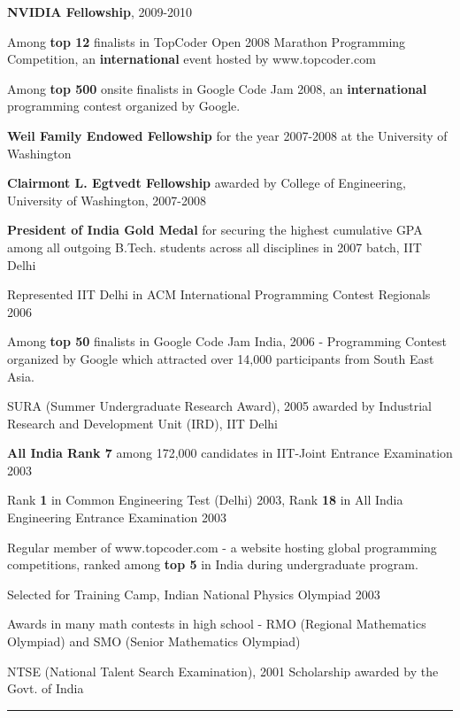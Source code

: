 \documentclass[10pt]{article}
\newenvironment{itemize*}%
  {\begin{itemize}%
    \setlength{\itemsep}{0pt}%
    \setlength{\parskip}{0pt}%
	}
  {\end{itemize}}
\begin{document}
\begin{itemize*}
\item \textbf{NVIDIA Fellowship}, 2009-2010
\item Among \textbf{top 12} finalists in TopCoder Open 2008 Marathon Programming Competition, an \textbf{international} event hosted by www.topcoder.com
\item Among \textbf{top 500} onsite finalists in Google Code Jam 2008, an \textbf{international} programming contest organized by Google.
\item \textbf{Weil Family Endowed Fellowship} for the year 2007-2008 at the University of Washington
\item \textbf{Clairmont L. Egtvedt Fellowship} awarded by College of Engineering, University of Washington, 2007-2008
\item \textbf{President of India Gold Medal} for securing the highest cumulative GPA among all outgoing B.Tech. students  across all disciplines in 2007 batch, IIT Delhi
\item Represented IIT Delhi in ACM International Programming Contest Regionals 2006
\item Among \textbf{top 50} finalists in Google Code Jam India, 2006 - Programming Contest organized by Google which attracted over 14,000 participants from South East Asia.
\item SURA (Summer Undergraduate Research Award), 2005 awarded by Industrial Research and Development Unit (IRD), IIT Delhi
\item \textbf{All India Rank 7} among 172,000 candidates in IIT-Joint Entrance Examination 2003
\item Rank \textbf{1} in Common Engineering Test (Delhi) 2003, Rank \textbf{18} in All India Engineering Entrance Examination 2003
\item Regular member of www.topcoder.com - a website hosting global programming competitions, ranked among \textbf{top 5} in India during undergraduate program.
\item Selected for Training Camp, Indian  National Physics Olympiad 2003
\item Awards in many math contests in high school - RMO (Regional Mathematics Olympiad) and SMO (Senior Mathematics Olympiad)
\item NTSE (National Talent Search Examination), 2001 Scholarship awarded by the Govt. of India
\end{itemize*}
\rule{6.5in}{2pt}
\\
\vspace{0.10in}
\end{document}
